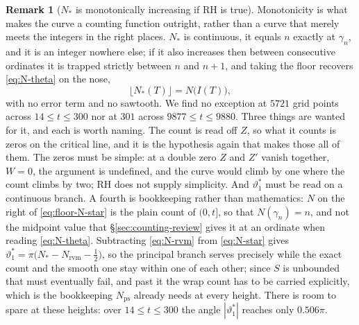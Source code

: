 \documentclass[11pt]{article}
\theoremstyle{definition}
\newtheorem{remark}[theorem]{Remark}
\begin{document}
\begin{remark}[$N_{\ast}$ is monotonically increasing if RH is true]
Monotonicity is what makes the curve a counting function outright, rather than a
curve that merely meets the integers in the right places. $N_{\ast}$ is
continuous, it equals $n$ exactly at $\gamma_n$, and it is an integer nowhere
else; if it also increases then between consecutive ordinates it is trapped
strictly between $n$ and $n+1$, and taking the floor recovers
\eqref{eq:N-theta} on the nose,
\begin{equation}\label{eq:floor-N-star}
\bigl\lfloor N_{\ast}(T)\bigr\rfloor=N\bigl(I(T)\bigr),
\end{equation}
with no error term and no sawtooth. We find no exception at $5721$ grid points
across $14\leq t\leq300$ nor at $301$ across $9877\leq t\leq9880$. Three things
are wanted for it, and each is worth naming. The count is read off $Z$, so what
it counts is zeros on the critical line, and it is the hypothesis again that
makes those all of them. The zeros must be simple: at a double zero $Z$ and $Z'$
vanish together, $W=0$, the argument is undefined, and the curve would climb by
one where the count climbs by two; RH does not supply simplicity.
And $\vartheta_1^{\ast}$ must be read on a continuous branch. A fourth is
bookkeeping rather than mathematics: $N$ on the right of
\eqref{eq:floor-N-star} is the plain count of $(0,t]$, so that
$N(\gamma_n)=n$, and not the midpoint value that \S\ref{sec:counting-review}
gives it at an ordinate when reading \eqref{eq:N-theta}. Subtracting
\eqref{eq:N-rvm} from \eqref{eq:N-star} gives
$\vartheta_1^{\ast}=\pi\bigl(N_{\ast}-N_{\mathrm{rvm}}-\tfrac12\bigr)$, so the
principal branch serves precisely while the exact count and the smooth one stay
within one of each other; since $S$ is unbounded that must eventually fail, and
past it the wrap count has to be carried explicitly, which is the bookkeeping
$N_{\mathrm{ps}}$ already needs at every height. There is room to spare at these
heights: over $14\leq t\leq300$ the angle $|\vartheta_1^{\ast}|$ reaches only
$0.506\pi$.


\end{remark}
\end{document}
